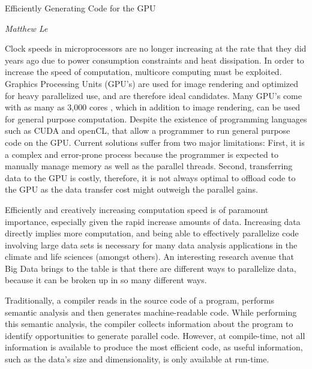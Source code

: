 \documentclass[a4paper,12pt]{article}
\begin{document}
\begin{center}
{\Large Efficiently Generating Code for the GPU}

\emph{Matthew Le}
\end{center}

Clock speeds in microprocessors are no longer increasing at the rate that they did years ago due to power consumption constraints and heat dissipation. In order to increase the speed of computation, multicore computing must be exploited. Graphics Processing Units (GPU's) are used for image rendering and optimized for heavy parallelized use, and are therefore ideal candidates. Many GPU's come with as many as 3,000 cores \cite{nvideaGPU}, which in addition to image rendering, can be used for general purpose computation. Despite the existence of programming languages such as CUDA and openCL, that allow a programmer to run general purpose code on the GPU. Current solutions suffer from two major limitations: First, it is a complex and error-prone process because the programmer is expected to manually manage memory as well as the parallel threads. Second, 
transferring data to the GPU is costly, therefore, it is not always optimal to offload code to the GPU as the data transfer cost might outweigh the parallel gains.

Efficiently and creatively increasing computation speed is of paramount importance, especially given the rapid increase amounts of data. Increasing data directly implies more computation, and being able to effectively parallelize code involving large data sets is necessary for many data analysis applications in the climate and life sciences (amongst others). An interesting research avenue that Big Data brings to the table is that there are different ways to parallelize data, because it can be broken up in so many different ways.



Traditionally, a compiler reads in the source code of a program, performs semantic analysis and then generates machine-readable code. While performing this semantic analysis, the compiler collects information about the program to identify opportunities to generate parallel code. However, at compile-time, not all information is available to produce the most efficient code, as useful information, such as the data's size and dimensionality, is only available at run-time.


\end{document}
